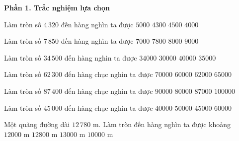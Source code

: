 \textbf{Phần 1. Trắc nghiệm lựa chọn}

\begin{ex} %
Làm tròn số $4\,320$ đến hàng nghìn ta được
\choice
{$5000$}
{$4300$}
{$4500$}
{\True $4000$}
\end{ex}

\begin{ex} %
Làm tròn số $7\,850$ đến hàng nghìn ta được
\choice
{$7000$}
{$7800$}
{\True $8000$}
{$9000$}
\end{ex}

\begin{ex} %
Làm tròn số $34\,500$ đến hàng nghìn ta được
\choice
{$34000$}
{$30000$}
{$40000$}
{\True $35000$}
\end{ex}

\begin{ex} %
Làm tròn số $62\,300$ đến hàng chục nghìn ta được
\choice
{$70000$}
{\True $60000$}
{$62000$}
{$65000$}
\end{ex}

\begin{ex} %
Làm tròn số $87\,400$ đến hàng chục nghìn ta được
\choice
{\True $90000$}
{$80000$}
{$87000$}
{$100000$}
\end{ex}

\begin{ex} %
Làm tròn số $45\,000$ đến hàng chục nghìn ta được
\choice
{$40000$}
{\True $50000$}
{$45000$}
{$60000$}
\end{ex}

\begin{ex} %
Một quãng đường dài $12\,780\text{ m}$. Làm tròn đến hàng nghìn ta được khoảng
\choice
{$12000\text{ m}$}
{$12800\text{ m}$}
{\True $13000\text{ m}$}
{$10000\text{ m}$}
\end{ex}

